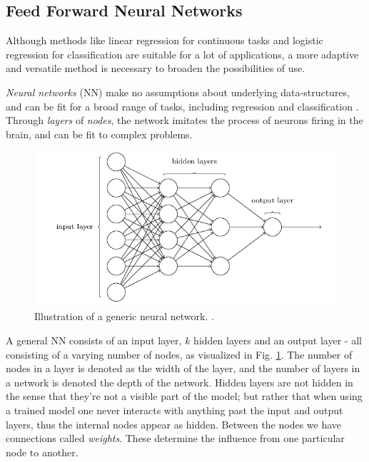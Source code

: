 \subsection{Feed Forward Neural Networks}\label{sec:nn}
Although methods like linear regression for continuous tasks and logistic regression for classification are suitable for a lot of applications, a more adaptive and versatile method is necessary to broaden the possibilities of use. 

\textit{Neural networks} (NN) make no assumptions about underlying data-structures, and can be fit for a broad range of tasks, including regression and classification \citep[Neural networks]{morten}. Through \textit{layers} of \textit{nodes}, the network imitates the process of neurons firing in the brain, and can be fit to complex problems.

\begin{figure}[h!]
    \centering
    \includegraphics[width=1\linewidth]{project_2/figures/generic_NN.png}
    \caption{Illustration of a generic neural network. \cite[Taken from][The architecture of neural networks]{nielsen}.}
    \label{fig:NN}
\end{figure}

A general NN consists of an input layer, $k$ hidden layers and an output layer - all consisting of a varying number of nodes, as visualized in Fig. \ref{fig:NN}. The number of nodes in a layer is denoted as the width of the layer, and the number of layers in a network is denoted the depth of the network. 
Hidden layers are not hidden in the sense that they're not a visible part of the model; but rather that when using a trained model one never interacts with anything past the input and output layers, thus the internal nodes appear as hidden. 
Between the nodes we have connections called \textit{weights}. These determine the influence from one particular node to another. 

